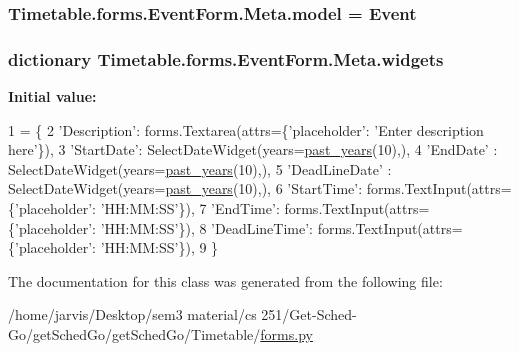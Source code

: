 \subsubsection[{\texorpdfstring{model}{model}}]{\setlength{\rightskip}{0pt plus 5cm}Timetable.\+forms.\+Event\+Form.\+Meta.\+model = {\bf Event}\hspace{0.3cm}{\ttfamily [static]}}\hypertarget{classTimetable_1_1forms_1_1EventForm_1_1Meta_a02301bd84120cfd745e32233480b8509}{}\label{classTimetable_1_1forms_1_1EventForm_1_1Meta_a02301bd84120cfd745e32233480b8509}
\subsubsection[{\texorpdfstring{widgets}{widgets}}]{\setlength{\rightskip}{0pt plus 5cm}dictionary Timetable.\+forms.\+Event\+Form.\+Meta.\+widgets\hspace{0.3cm}{\ttfamily [static]}}\hypertarget{classTimetable_1_1forms_1_1EventForm_1_1Meta_ada8de9ad4fda997c8563b1aaa0429f37}{}\label{classTimetable_1_1forms_1_1EventForm_1_1Meta_ada8de9ad4fda997c8563b1aaa0429f37}
{\bfseries Initial value\+:}
\begin{DoxyCode}
1 = \{
2                 \textcolor{stringliteral}{'Description'}: forms.Textarea(attrs=\{\textcolor{stringliteral}{'placeholder'}: \textcolor{stringliteral}{'Enter description here'}\}),
3                 \textcolor{stringliteral}{'StartDate'}: SelectDateWidget(years=\hyperlink{namespaceTimetable_1_1forms_a4af0bb23874a094ad7dd2dc09f924c42}{past\_years}(10),),
4                 \textcolor{stringliteral}{'EndDate'} : SelectDateWidget(years=\hyperlink{namespaceTimetable_1_1forms_a4af0bb23874a094ad7dd2dc09f924c42}{past\_years}(10),),
5                 \textcolor{stringliteral}{'DeadLineDate'} : SelectDateWidget(years=\hyperlink{namespaceTimetable_1_1forms_a4af0bb23874a094ad7dd2dc09f924c42}{past\_years}(10),),
6                 \textcolor{stringliteral}{'StartTime'}: forms.TextInput(attrs=\{\textcolor{stringliteral}{'placeholder'}: \textcolor{stringliteral}{'HH:MM:SS'}\}),
7                 \textcolor{stringliteral}{'EndTime'}: forms.TextInput(attrs=\{\textcolor{stringliteral}{'placeholder'}: \textcolor{stringliteral}{'HH:MM:SS'}\}),
8                 \textcolor{stringliteral}{'DeadLineTime'}: forms.TextInput(attrs=\{\textcolor{stringliteral}{'placeholder'}: \textcolor{stringliteral}{'HH:MM:SS'}\}),
9             \}
\end{DoxyCode}


The documentation for this class was generated from the following file\+:\begin{DoxyCompactItemize}
\item 
/home/jarvis/\+Desktop/sem3 material/cs 251/\+Get-\/\+Sched-\/\+Go/get\+Sched\+Go/get\+Sched\+Go/\+Timetable/\hyperlink{Timetable_2forms_8py}{forms.\+py}\end{DoxyCompactItemize}
